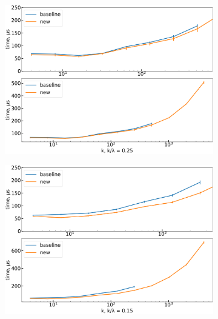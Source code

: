 \documentclass[final,5p,twocolumn,times,authoryear]{elsarticle}
\begin{document}
\begin{figure}[t]
	\centering
	\begin{subfigure}[t]{0.46\textwidth}
		\centering
		\includegraphics[width=\linewidth]{boost_scale_fixed_0_25.png}
		\caption{}
	\end{subfigure}
	\quad
	\begin{subfigure}[t]{0.46\textwidth}
		\centering
		\includegraphics[width=\linewidth]{boost_scale_fixed_0_15.png}
		\caption{}
	\end{subfigure} \\
	\begin{subfigure}[t]{0.46\textwidth}
		\centering

\end{subfigure}
\end{figure}
\end{document}
